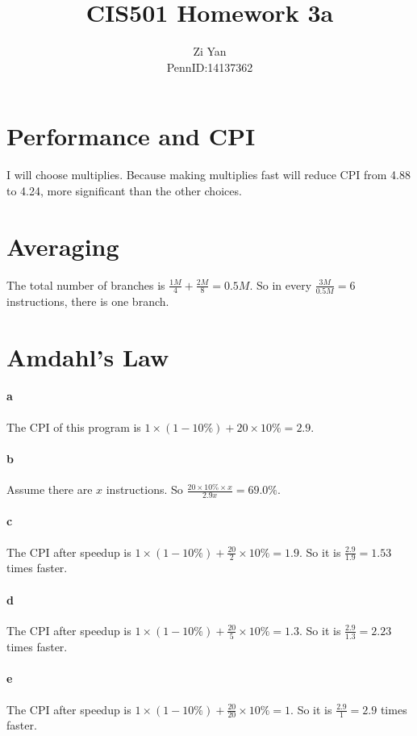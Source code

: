\documentclass[12pt,letterpaper]{article}
\author{Zi Yan\\PennID:14137362}
\title{CIS501 Homework 3a}
\date{}
\begin{document}
\maketitle

\section{Performance and CPI}
I will choose multiplies. Because making multiplies fast will reduce CPI
from 4.88 to 4.24, more significant than the other choices.

\section{Averaging}
The total number of branches is $\frac{1M}{4}+\frac{2M}{8} = 0.5M$.
So in every $\frac{3M}{0.5M} = 6$ instructions, there is one branch.

\section{Amdahl's Law}
\paragraph*{a}
The CPI of this program is $1 \times (1-10\%) + 20 \times 10\% = 2.9$.

\paragraph*{b}
Assume there are $x$ instructions. So $\frac{20\times10\%\times x}{2.9x}
=69.0\%$.

\paragraph*{c}
The CPI after speedup is $1\times (1-10\%) + \frac{20}{2}\times 10\% = 1.9$.
So it is $\frac{2.9}{1.9}=1.53$ times faster.

\paragraph*{d}
The CPI after speedup is $1\times (1-10\%) + \frac{20}{5}\times 10\% = 1.3$.
So it is $\frac{2.9}{1.3}=2.23$ times faster.

\paragraph*{e}
The CPI after speedup is $1\times (1-10\%) + \frac{20}{20}\times 10\% = 1$.
So it is $\frac{2.9}{1}=2.9$ times faster.
\end{document}
